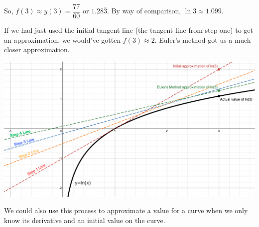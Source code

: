 \begin{tcolorbox}[solution]
    So, $f(3) \approx y(3) = \boxed{\dfrac{77}{60}} \text{ or } \boxed{1.28\overline{3}}$. By way of comparison, $\ln 3 \approx 1.099$. 
\end{tcolorbox}

If we had just used the initial tangent line (the tangent line from step one) to get an approximation, we would've gotten $f(3) \approx 2$. Euler's method got us a much closer approximation. \par

\includegraphics[width=\textwidth]{Support/Chapter 1 Graphics/1.6-Graphic3.png}

We could also use this process to approximate a value for a curve when we only
know its derivative and an initial value on the curve. \par

